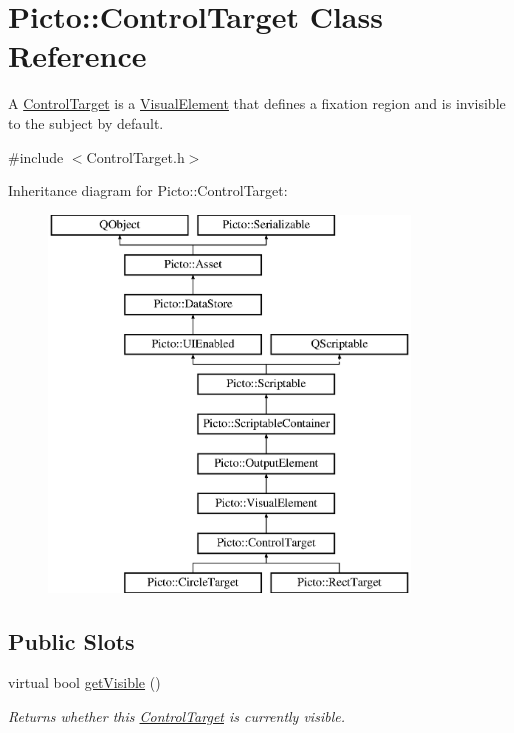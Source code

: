 \hypertarget{class_picto_1_1_control_target}{\section{Picto\-:\-:Control\-Target Class Reference}
\label{class_picto_1_1_control_target}
}


A \hyperlink{class_picto_1_1_control_target}{Control\-Target} is a \hyperlink{struct_picto_1_1_visual_element}{Visual\-Element} that defines a fixation region and is invisible to the subject by default.  




{\ttfamily \#include $<$Control\-Target.\-h$>$}

Inheritance diagram for Picto\-:\-:Control\-Target\-:\begin{figure}[H]
\begin{center}
\leavevmode
\includegraphics[height=10.000000cm]{class_picto_1_1_control_target}
\end{center}
\end{figure}
\subsection*{Public Slots}
\begin{DoxyCompactItemize}
\item 
virtual bool \hyperlink{class_picto_1_1_control_target_ad16278dee3e866f5cd49dbecde604797}{get\-Visible} ()
\begin{DoxyCompactList}\small\item\em Returns whether this \hyperlink{class_picto_1_1_control_target}{Control\-Target} is currently visible. \end{DoxyCompactList}\end{DoxyCompactItemize}
